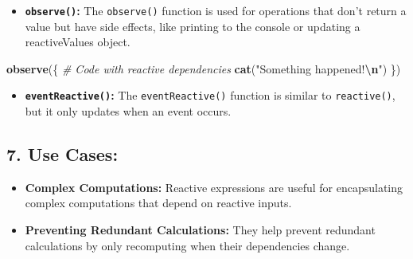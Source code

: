 \documentclass[
]{book}
\newenvironment{Shaded}{\begin{snugshade}}{\end{snugshade}}
\newcommand{\CommentTok}[1]{\textcolor[rgb]{0.56,0.35,0.01}{\textit{#1}}}
\newcommand{\FunctionTok}[1]{\textcolor[rgb]{0.13,0.29,0.53}{\textbf{#1}}}
\newcommand{\NormalTok}[1]{#1}
\newcommand{\OtherTok}[1]{\textcolor[rgb]{0.56,0.35,0.01}{#1}}
\newcommand{\SpecialCharTok}[1]{\textcolor[rgb]{0.81,0.36,0.00}{\textbf{#1}}}
\newcommand{\StringTok}[1]{\textcolor[rgb]{0.31,0.60,0.02}{#1}}
\providecommand{\tightlist}{%
  \setlength{\itemsep}{0pt}\setlength{\parskip}{0pt}}
\begin{document}
\begin{itemize}
\tightlist
\item
  \textbf{\texttt{observe()}:} The \texttt{observe()} function is used for operations that don't return a value but have side effects, like printing to the console or updating a reactiveValues object.
\end{itemize}

\begin{Shaded}
\begin{Highlighting}[]
\FunctionTok{observe}\NormalTok{(\{}
  \CommentTok{\# Code with reactive dependencies}
  \FunctionTok{cat}\NormalTok{(}\StringTok{"Something happened!}\SpecialCharTok{\textbackslash{}n}\StringTok{"}\NormalTok{)}
\NormalTok{\})}
\end{Highlighting}
\end{Shaded}

\begin{itemize}
\tightlist
\item
  \textbf{\texttt{eventReactive()}:} The \texttt{eventReactive()} function is similar to \texttt{reactive()}, but it only updates when an event occurs.
\end{itemize}

\begin{Shaded}
\end{Shaded}

\hypertarget{use-cases}{%
\subsection{\texorpdfstring{7. \textbf{Use Cases:}}{7. Use Cases:}}\label{use-cases}}

\begin{itemize}
\tightlist
\item
  \textbf{Complex Computations:} Reactive expressions are useful for encapsulating complex computations that depend on reactive inputs.
\item
  \textbf{Preventing Redundant Calculations:} They help prevent redundant calculations by only recomputing when their dependencies change.
\end{itemize}
\end{document}
